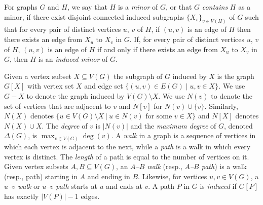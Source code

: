 For graphs $G$ and $H$, we say that $H$ is a {\em minor} of $G$, or that $G$ {\em contains} $H$ as a minor, if there exist disjoint connected induced subgraphs $\{X_v\}_{v \in V(H)}$ of $G$ such that for every pair of distinct vertices $u$, $v$ of $H$, if $(u,v)$ is an edge of $H$ then there exists an edge from $X_u$ to $X_v$ in $G$. If, for every pair of distinct vertices $u$, $v$ of $H$, $(u,v)$ is an edge of $H$ if and only if there exists an edge from $X_u$ to $X_v$ in $G$, then $H$ is an {\em induced minor} of $G$.


Given a vertex subset $X\subseteq V(G)$ the subgraph of $G$ induced by $X$ is the graph $G[X]$ with vertex set $X$ and edge set $\{(u,v)\in E(G) \mid u,v\in X\}$. We use $G-X$ to denote the graph induced by $V(G)\setminus X$.
% 
We use $N(v)$ to denote the set of vertices that are adjacent to $v$ and $N[v]$ for $N(v)\cup\{v\}$. Similarly, $N(X)$ denotes $\{u\in V(G)\setminus X\ |\ u\in N(v) \text{ for some } v\in X\}$ and $N[X]$ denotes $N(X)\cup X$. The \emph{degree} of $v$ is $|N(v)|$ and the \emph{maximum degree} of $G$, denoted $\Delta(G)$, is $\max_{v \in V(G)} \deg(v)$.
% 
% 
A \emph{walk} in a graph is a sequence of vertices in which each vertex is adjacent to the next, while a \emph{path} is a walk in which every vertex is distinct. The \emph{length} of a path is equal to the number of vertices on it. Given vertex subsets $A,B\subseteq V(G)$, an \emph{$A$--$B$ walk} (resp., \emph{$A$--$B$ path}) is a walk (resp., path) starting in $A$ and ending in $B$. Likewise, for vertices $u,v\in V(G)$, a \emph{$u$--$v$ walk} or \emph{$u$--$v$ path} starts at $u$ and ends at $v$. A path $P$ in $G$ is \emph{induced} if $G[P]$ has exactly $|V(P)|-1$ edges. 

